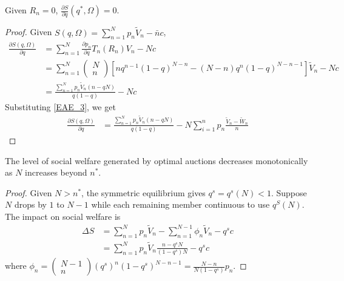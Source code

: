 \documentclass[11pt]{elegantbook}
\begin{document}
\begin{lemma}
    Given $R_n=0$, $\frac{\partial S}{\partial q}(q^*,\Omega)=0$.
\end{lemma}
\begin{proof}
    Given $S(q,\Omega)=\sum_{n=1}^N p_n \tilde{V}_n-\bar{n}c$,
    \begin{equation}
        \begin{aligned}
            \frac{\partial S(q,\Omega)}{\partial q}&=\sum_{n=1}^N \frac{\partial p_n}{\partial q} T_n(R_n)V_n-Nc\\
            &=\sum_{n=1}^N\begin{pmatrix}N\\n\end{pmatrix}\left[n q^{n-1}(1-q)^{N-n}-(N-n)q^n(1-q)^{N-n-1}\right]\tilde{V}_n-Nc\\
            &=\frac{\sum_{n=1}^N p_n \tilde{V}_n (n-qN)}{q(1-q)}-Nc
        \end{aligned}
        \nonumber
    \end{equation}
    Substituting \eqref{EAE_3}, we get
    \begin{equation}
        \begin{aligned}
            \frac{\partial S(q,\Omega)}{\partial q}&=\frac{\sum_{n=1}^N p_n \tilde{V}_n (n-qN)}{q(1-q)}-N\sum_{i=1}^n p_n \frac{\tilde{V}_n-\tilde{W}_n}{n}
        \end{aligned}
        \nonumber
    \end{equation}
\end{proof}



\begin{proposition}
    The level of social welfare generated by optimal auctions decreases monotonically as $N$ increases beyond $n^*$.
\end{proposition}
\begin{proof}
    Given $N>n^*$, the symmetric equilibrium gives $q^s=q^s(N)<1$. Suppose $N$ drops by $1$ to $N-1$ while each remaining member continuous to use $q^S(N)$. The impact on social welfare is
    \begin{equation}
        \begin{aligned}
            \Delta S&=\sum_{n=1}^Np_n\tilde{V}_n-\sum_{n=1}^{N-1}\phi_n\tilde{V}_n-q^sc\\
            &=\sum_{n=1}^Np_n\tilde{V}_n\frac{n-q^sN}{(1-q^s)N}-q^sc
        \end{aligned}
        \nonumber
    \end{equation}
    where $\phi_n=\begin{pmatrix}N-1\\n\end{pmatrix}(q^s)^{n}(1-q^s)^{N-n-1}=\frac{N-n}{N(1-q^s)}p_n$.
\end{proof}
\end{document}
